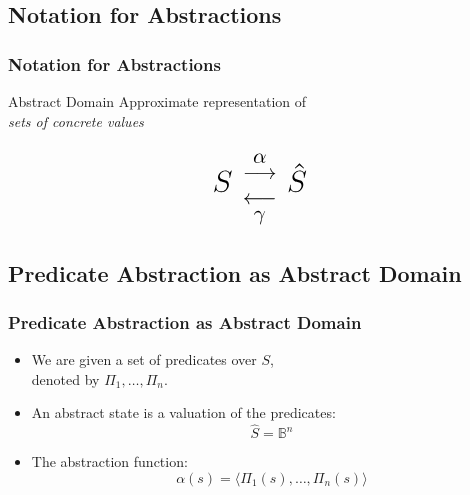 \subsection{Notation for Abstractions}

\begin{frame}
\frametitle{Notation for Abstractions}

\begin{center}
\begin{minipage}{0.8\textwidth}
\begin{block}{\centering Abstract Domain}
\vspace{0.5ex}
\centering Approximate representation of \\
\emph{\color{ta3chameleon}sets of concrete values}
\vspace{0.5ex}
\end{block}
\end{minipage}

\[ \scalebox{1.5}{$\mbox{\Large $S$} \begin{array}{c}
\alpha \\[-1ex]
\longrightarrow \\
\longleftarrow \\[-1ex]
\gamma
\end{array} \mbox{\Large $\hat S$}$} \]

\end{center}

\end{frame}


\subsection{Predicate Abstraction as Abstract Domain}

\begin{frame}
\frametitle{Predicate Abstraction as Abstract Domain}

\begin{itemize}
\item We are given a set of predicates over $S$,\\
denoted by $\Pi_1,\ldots,\Pi_n$.
\vfill

\item An abstract state is a valuation of the predicates:
%
\[ \hat S = \mathbb B ^ n \]
\vfill

\item The abstraction function:
%
\[ \alpha(s) = \langle \Pi_1(s), \ldots, \Pi_n(s) \rangle \]
\end{itemize}

\end{frame}

